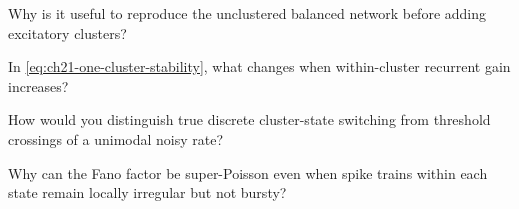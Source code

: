 \begin{conceptquestions}
  \item Why is it useful to reproduce the unclustered balanced network before adding excitatory clusters?
  \item In \cref{eq:ch21-one-cluster-stability}, what changes when within-cluster recurrent gain increases?
  \item How would you distinguish true discrete cluster-state switching from threshold crossings of a unimodal noisy rate?
  \item Why can the Fano factor be super-Poisson even when spike trains within each state remain locally irregular but not bursty?
\end{conceptquestions}
